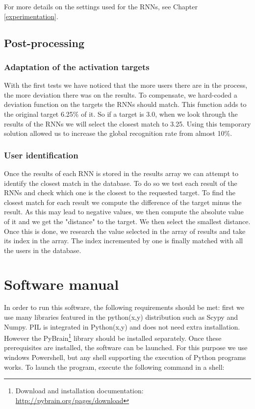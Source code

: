 \documentclass[a4paper]{article}
\begin{document}
{For more details on the settings used for the RNNs, see Chapter \ref{experimentation}.

\subsection{Post-processing}
\subsubsection{Adaptation of the activation targets}
With the first tests we have noticed that the more users there are in the process, the more deviation there was on the results. To compensate, we hard-coded a deviation function on the targets the RNNs should match. This function adds to the original target 6.25\% of it. So if a target is 3.0, when we look through the results of the RNNs we will select the closest match to 3.25. Using this temporary solution allowed us to increase the global  recognition rate from almost 10\%.

\subsubsection{User identification}
Once the results of each RNN is stored in the results array we can attempt to identify the closest match in the database. To do so we test each result of the RNNs and check which one is the closest to the requested target. To find the closest match for each result we compute the difference of the target minus the result. As this may lead to negative values, we then compute the absolute value of it and we get the "distance" to the target. We then select the smallest distance. Once this is done, we research the value selected in the array of results and take its index in the array. The index incremented by one is finally matched with all the users in the database.

\pagebreak

\section{Software manual}

In order to run this software, the following requirements should be met: first we use many libraries featured in the python(x,y) distribution such as Scypy and Numpy. PIL is integrated in Python(x,y) and does not need extra installation. However the PyBrain\footnote{Download and installation documentation: \url{http://pybrain.org/pages/download}} library should be installed separately. Once these prerequisites are installed, the software can be launched. For this purpose we use windows Powershell, but any shell supporting the execution of Python programs works. To launch the program, execute the following command in a shell:

}
\end{document}
